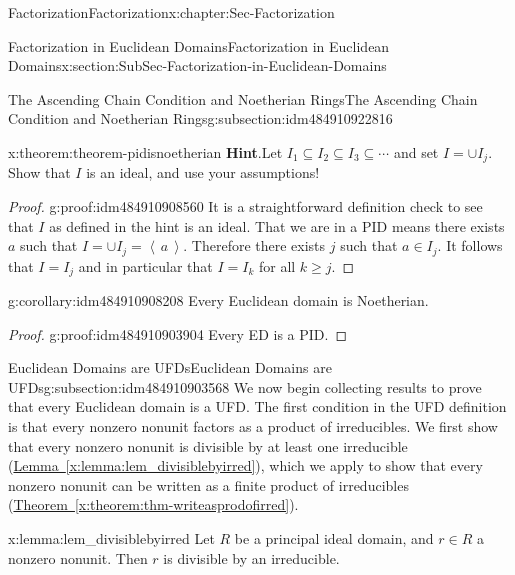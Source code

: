\documentclass[oneside,10pt,]{book}
\newcommand{\blocktitlefont}{\relax}
\newcommand{\xreffont}{\relax}
\numberwithin{equation}{section}
\renewcommand{\geq}{\geqslant}
\newcommand{\ideal}[1]{\left\langle\, #1 \,\right\rangle}
\begin{document}
\begin{chapterptx}{Factorization}{}{Factorization}{}{}{x:chapter:Sec-Factorization}
\begin{sectionptx}{Factorization in Euclidean Domains}{}{Factorization in Euclidean Domains}{}{}{x:section:SubSec-Factorization-in-Euclidean-Domains}
\begin{subsectionptx}{The Ascending Chain Condition and Noetherian Rings}{}{The Ascending Chain Condition and Noetherian Rings}{}{}{g:subsection:idm484910922816}
\begin{theorem}{}{}{x:theorem:theorem-pidisnoetherian}
\textbf{\blocktitlefont Hint}.\quad{}Let \(I_1\subseteq I_2\subseteq I_3 \subseteq \cdots\) and set \(I = \cup I_j\). Show that \(I\) is an ideal, and use your assumptions!%
\end{theorem}
\begin{proof}{}{g:proof:idm484910908560}
It is a straightforward definition check to see that \(I\) as defined in the hint is an ideal. That we are in a PID means there exists \(a\) such that \(I=\cup I_j=\ideal{a}\). Therefore there exists \(j\) such that \(a\in I_j\). It follows that \(I=I_j\) and in particular that \(I=I_k\) for all \(k\geq j\).%
\end{proof}
\begin{corollary}{}{}{g:corollary:idm484910908208}%
Every Euclidean domain is Noetherian.%
\end{corollary}
\begin{proof}{}{g:proof:idm484910903904}
Every ED is a PID.%
\end{proof}
\end{subsectionptx}
%
%
\typeout{************************************************}
\typeout{************************************************}
%
\begin{subsectionptx}{Euclidean Domains are UFDs}{}{Euclidean Domains are UFDs}{}{}{g:subsection:idm484910903568}
We now begin collecting results to prove that every Euclidean domain is a UFD. The first condition in the UFD definition is that every nonzero nonunit factors as a product of irreducibles. We first show that every nonzero nonunit is divisible by at least one irreducible (\hyperref[x:lemma:lem_divisiblebyirred]{Lemma~{\xreffont\ref{x:lemma:lem_divisiblebyirred}}}), which we apply to show that every nonzero nonunit can be written as a finite product of irreducibles (\hyperref[x:theorem:thm-writeasprodofirred]{Theorem~{\xreffont\ref{x:theorem:thm-writeasprodofirred}}}).%
\begin{lemma}{}{}{x:lemma:lem_divisiblebyirred}%
Let \(R\) be a principal ideal domain, and \(r\in R\) a nonzero nonunit. Then \(r\) is divisible by an irreducible.%


\end{lemma}
\end{subsectionptx}
\end{sectionptx}
\end{chapterptx}
\end{document}

